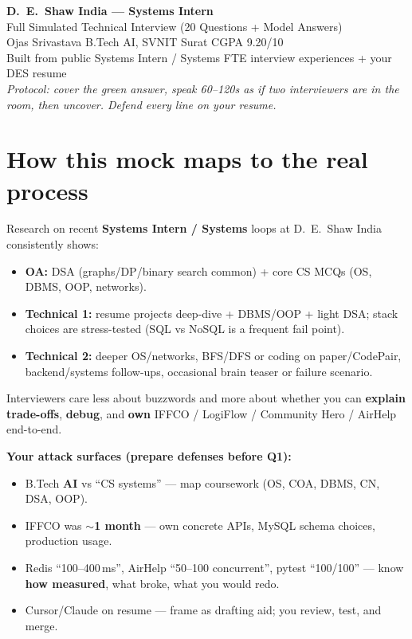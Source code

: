 \documentclass[9.5pt,a4paper]{extarticle}
\begin{document}
\begin{center}
  {\LARGE\bfseries\color{des} D.\ E.\ Shaw India --- Systems Intern}\\[2pt]
  {\large Full Simulated Technical Interview (20 Questions + Model Answers)}\\[4pt]
  {\normalsize Ojas Srivastava \textbar{} B.Tech AI, SVNIT Surat \textbar{} CGPA 9.20/10}\\[2pt]
  {\small\color{muted} Built from public Systems Intern / Systems FTE interview experiences + your DES resume}\\[2pt]
  {\small\textit{Protocol: cover the green answer, speak 60--120s as if two interviewers are in the room, then uncover. Defend every line on your resume.}}
\end{center}

\vspace{2mm}
\section*{How this mock maps to the real process}
Research on recent \textbf{Systems Intern / Systems} loops at D.\ E.\ Shaw India consistently shows:
\begin{itemize}
  \item \textbf{OA:} DSA (graphs/DP/binary search common) + core CS MCQs (OS, DBMS, OOP, networks).
  \item \textbf{Technical 1:} resume projects deep-dive + DBMS/OOP + light DSA; stack choices are stress-tested (SQL vs NoSQL is a frequent fail point).
  \item \textbf{Technical 2:} deeper OS/networks, BFS/DFS or coding on paper/CodePair, backend/systems follow-ups, occasional brain teaser or failure scenario.
\end{itemize}
Interviewers care less about buzzwords and more about whether you can \textbf{explain trade-offs}, \textbf{debug}, and \textbf{own} IFFCO / LogiFlow / Community Hero / AirHelp end-to-end.

\vspace{1mm}
\noindent\textbf{Your attack surfaces (prepare defenses before Q1):}
\begin{itemize}
  \item B.Tech \textbf{AI} vs ``CS systems'' --- map coursework (OS, COA, DBMS, CN, DSA, OOP).
  \item IFFCO was \textbf{$\sim$1 month} --- own concrete APIs, MySQL schema choices, production usage.
  \item Redis ``100--400\,ms'', AirHelp ``50--100 concurrent'', pytest ``100/100'' --- know \textbf{how measured}, what broke, what you would redo.
  \item Cursor/Claude on resume --- frame as drafting aid; you review, test, and merge.
\end{itemize}
\end{document}
